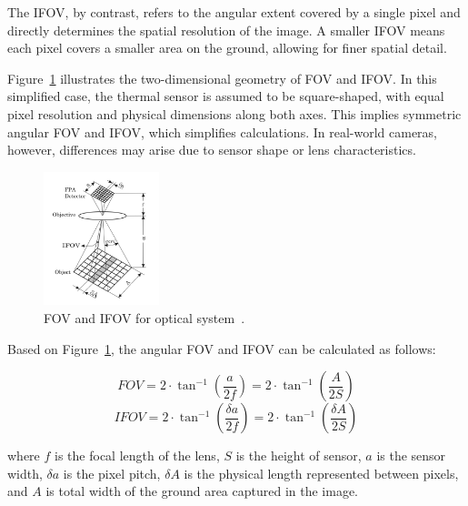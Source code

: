 The \gls{IFOV}, by contrast, refers to the angular extent covered by a single pixel and directly determines the spatial resolution of the image. A smaller \gls{IFOV} means each pixel covers a smaller area on the ground, allowing for finer spatial detail.

Figure~\ref{fig:fov_ifov} illustrates the two-dimensional geometry of \gls{FOV} and \gls{IFOV}. In this simplified case, the thermal sensor is assumed to be square-shaped, with equal pixel resolution and physical dimensions along both axes. This implies symmetric angular \gls{FOV} and \gls{IFOV}, which simplifies calculations. In real-world cameras, however, differences may arise due to sensor shape or lens characteristics.

\begin{figure}[H]
    \centering
    \includegraphics[width=0.3\textwidth]{figs/Huirui/fov_ifov_2d_diagram.png}
    \caption[Optical system FOV and IFOV]{FOV and IFOV for optical system~\cite{pencheva2006design}.}
    \label{fig:fov_ifov}
\end{figure}

Based on Figure~\ref{fig:fov_ifov}, the angular \gls{FOV} and \gls{IFOV} can be calculated as follows:

\begin{equation}
    FOV = 2 \cdot \tan^{-1} \left( \frac{a}{2f} \right) = 2 \cdot \tan^{-1} \left( \frac{A}{2S} \right)
    \label{eq:fov}
\end{equation}
\vspace{-1em}
\begin{equation}
    IFOV = 2 \cdot \tan^{-1} \left( \frac{\delta a}{2f} \right) = 2 \cdot \tan^{-1} \left( \frac{\delta A}{2S} \right)
\end{equation}

where \( f \) is the focal length of the lens, \( S \) is the height of sensor, \( a \) is the sensor width, \( \delta a \) is the pixel pitch, \( \delta A \) is the physical length represented between pixels, and \( A \) is total width of the ground area captured in the image.

